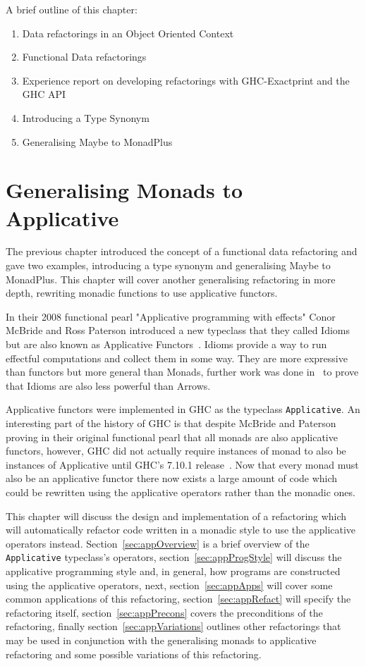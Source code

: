 A brief outline of this chapter:

\begin{enumerate}
\item Data refactorings in an Object Oriented Context
\item Functional Data refactorings
\item Experience report on developing refactorings with GHC-Exactprint and the GHC API
\item Introducing a Type Synonym
\item Generalising Maybe to MonadPlus
\end{enumerate}

\chapter{Generalising Monads to Applicative}
\label{applicative}
The previous chapter introduced the concept of a functional data refactoring and gave two examples, introducing a type synonym and generalising Maybe to MonadPlus. This chapter will cover another generalising refactoring in more depth, rewriting monadic functions to use applicative functors. 

In their 2008 functional pearl "Applicative programming with effects" Conor McBride and Ross Paterson introduced a new typeclass that they called Idioms but are also known as Applicative Functors~\citep{mcbrideIdioms}. Idioms provide a way to run effectful computations and collect them in some way. They are more expressive than functors but more general than Monads, further work was done in~\citep{arrowsAndIdioms} to prove that Idioms are also less powerful than Arrows.

Applicative functors were implemented in GHC as the typeclass \texttt{Applicative}. An interesting part of the history of GHC is that despite McBride and Paterson proving in their original functional pearl that all monads are also applicative functors, however,  GHC did not actually require instances of monad to also be instances of Applicative until GHC's 7.10.1 release~\citep{ghc7.10Release}. Now that every monad must also be an applicative functor there now exists a large amount of code which could be rewritten using the applicative operators rather than the monadic ones. 

This chapter will discuss the design and implementation of a refactoring which will automatically refactor code written in a monadic style to use the applicative operators instead. Section~\ref{sec:appOverview} is a brief overview of the \texttt{Applicative} typeclass's operators, section~\ref{sec:appProgStyle} will discuss the applicative programming style and, in general, how programs are constructed using the applicative operators, next, section~\ref{sec:appApps} will cover some common applications of this refactoring, section~\ref{sec:appRefact} will specify the refactoring itself, section~\ref{sec:appPrecons} covers the preconditions of the refactoring, finally section~\ref{sec:appVariations} outlines other refactorings that may be used in conjunction with the generalising monads to applicative refactoring and some possible variations of this refactoring. 

